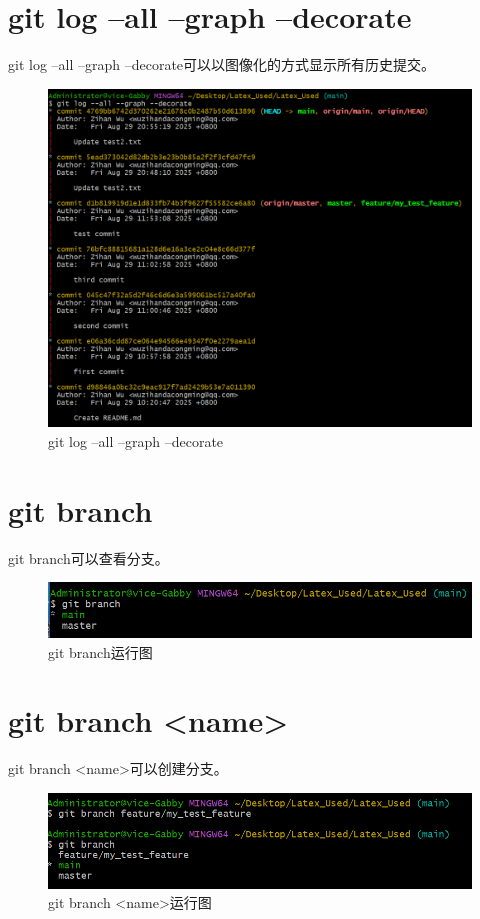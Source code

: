 \documentclass{article}
\begin{document}
\section{git log --all --graph --decorate}
git log --all --graph --decorate可以以图像化的方式显示所有历史提交。
\begin{figure}[H]
    \centering
    \includegraphics[width=1\linewidth]{git_log_decorate.png}
    \caption{git log --all --graph --decorate}
    \label{fig:log1}
\end{figure}

\section{git branch}
git branch可以查看分支。
\begin{figure}[H]
    \centering
    \includegraphics[width=1\linewidth]{git_branch.png}
    \caption{git branch运行图}
    \label{fig:branch}
\end{figure}

\section{git branch <name>}
git branch <name>可以创建分支。
\begin{figure}[H]
    \centering
    \includegraphics[width=1\linewidth]{git_branch_name.png}
    \caption{git branch <name>运行图}
    \label{fig:branch1}
\end{figure}
\end{document}

